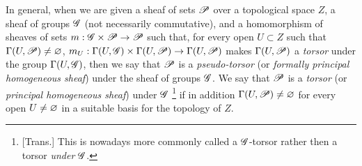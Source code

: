 \begin{env}[16.5.15]
\label{IV.16.5.15}
In general, when we are given a sheaf of sets $\mathscr{P}$ over a topological space $Z$, a sheaf of groups $\mathscr{G}$ (not necessarily commutative), and a homomorphism of sheaves of sets $m : \sh{G} \times \sh{P} \to \sh{P}$ such that, for every open $U \subset Z$ such that $\Gamma(U, \mathscr{P}) \neq \varnothing$, $m_U : \Gamma(U, \sh{G}) \times \Gamma(U, \sh{P}) \to \Gamma(U, \sh{P})$ makes $\Gamma(U, \mathscr{P})$ a \emph{torsor} under the group $\Gamma(U,\mathscr{G})$, then we say that $\mathscr{P}$ is a \emph{pseudo-torsor} (or \emph{formally principal homogeneous sheaf}) under the sheaf of groups $\mathscr{G}$.
We say that $\mathscr{P}$ is a \emph{torsor} (or \emph{principal homogeneous sheaf}) under $\mathscr{G}$
\footnote{
[Trans.] This is nowadays more commonly called a $\mathscr{G}$-torsor rather then a torsor \emph{under} $\mathscr{G}$.
}
if in addition $\Gamma(U, \mathscr{P}) \neq \varnothing$ for every open $U \neq \varnothing$ in a suitable basis for the topology of $Z$.


\end{env}
